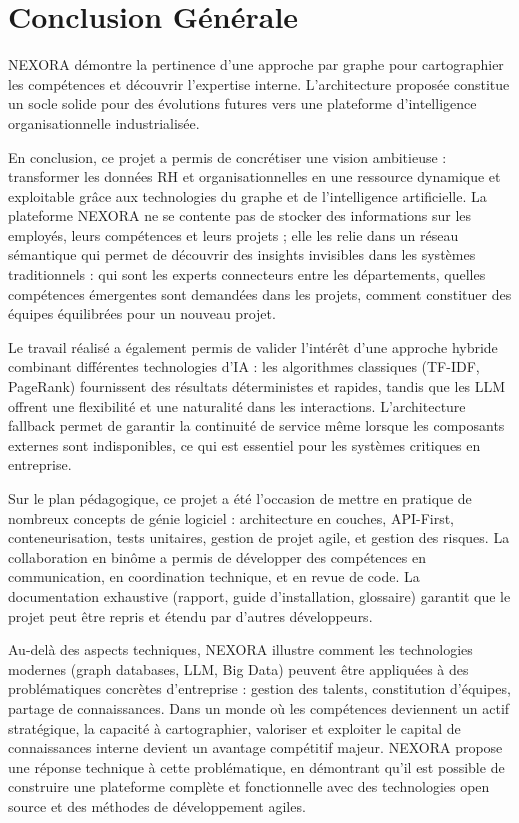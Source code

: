 \documentclass[12pt,a4paper]{report}
\begin{document}
\section{Conclusion Générale}
NEXORA démontre la pertinence d'une approche par graphe pour cartographier les compétences et découvrir l'expertise interne. L'architecture proposée constitue un socle solide pour des évolutions futures vers une plateforme d'intelligence organisationnelle industrialisée.

En conclusion, ce projet a permis de concrétiser une vision ambitieuse : transformer les données RH et organisationnelles en une ressource dynamique et exploitable grâce aux technologies du graphe et de l'intelligence artificielle. La plateforme NEXORA ne se contente pas de stocker des informations sur les employés, leurs compétences et leurs projets ; elle les relie dans un réseau sémantique qui permet de découvrir des insights invisibles dans les systèmes traditionnels : qui sont les experts connecteurs entre les départements, quelles compétences émergentes sont demandées dans les projets, comment constituer des équipes équilibrées pour un nouveau projet.

Le travail réalisé a également permis de valider l'intérêt d'une approche hybride combinant différentes technologies d'IA : les algorithmes classiques (TF-IDF, PageRank) fournissent des résultats déterministes et rapides, tandis que les LLM offrent une flexibilité et une naturalité dans les interactions. L'architecture fallback permet de garantir la continuité de service même lorsque les composants externes sont indisponibles, ce qui est essentiel pour les systèmes critiques en entreprise.

Sur le plan pédagogique, ce projet a été l'occasion de mettre en pratique de nombreux concepts de génie logiciel : architecture en couches, API-First, conteneurisation, tests unitaires, gestion de projet agile, et gestion des risques. La collaboration en binôme a permis de développer des compétences en communication, en coordination technique, et en revue de code. La documentation exhaustive (rapport, guide d'installation, glossaire) garantit que le projet peut être repris et étendu par d'autres développeurs.

Au-delà des aspects techniques, NEXORA illustre comment les technologies modernes (graph databases, LLM, Big Data) peuvent être appliquées à des problématiques concrètes d'entreprise : gestion des talents, constitution d'équipes, partage de connaissances. Dans un monde où les compétences deviennent un actif stratégique, la capacité à cartographier, valoriser et exploiter le capital de connaissances interne devient un avantage compétitif majeur. NEXORA propose une réponse technique à cette problématique, en démontrant qu'il est possible de construire une plateforme complète et fonctionnelle avec des technologies open source et des méthodes de développement agiles.
\end{document}
